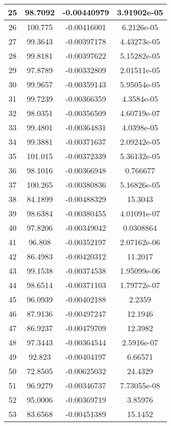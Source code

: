 \begin{table}[h]
{\begin{tabular}{|c|c|c|c|}
25 & 98.7092 & -0.00440979 & 3.91902e-05 \\ \hline 
26 & 100.775 & -0.00416001 & 6.2126e-05 \\ \hline 
27 & 99.3643 & -0.00397178 & 4.43273e-05 \\ \hline 
28 & 99.8181 & -0.00397622 & 5.15282e-05 \\ \hline 
29 & 97.8789 & -0.00332809 & 2.01511e-05 \\ \hline 
30 & 99.9657 & -0.00359143 & 5.95054e-05 \\ \hline 
31 & 99.7239 & -0.00366359 & 4.3584e-05 \\ \hline 
32 & 98.0351 & -0.00356509 & 4.60719e-07 \\ \hline 
33 & 99.4801 & -0.00364831 & 4.0398e-05 \\ \hline 
34 & 99.3881 & -0.00371637 & 2.09242e-05 \\ \hline 
35 & 101.015 & -0.00372339 & 5.36132e-05 \\ \hline 
36 & 98.1016 & -0.00366948 & 0.766677 \\ \hline 
37 & 100.265 & -0.00380836 & 5.16826e-05 \\ \hline 
38 & 84.1899 & -0.00488329 & 15.3043 \\ \hline 
39 & 98.6384 & -0.00380455 & 4.01091e-07 \\ \hline 
40 & 97.8206 & -0.00349042 & 0.0308864 \\ \hline 
41 & 96.808 & -0.00352197 & 2.07162e-06 \\ \hline 
42 & 86.4983 & -0.00420312 & 11.2017 \\ \hline 
43 & 99.1538 & -0.00374538 & 1.95099e-06 \\ \hline 
44 & 98.6514 & -0.00371103 & 1.79772e-07 \\ \hline 
45 & 96.0939 & -0.00402188 & 2.2359 \\ \hline 
46 & 87.9136 & -0.00497247 & 12.1946 \\ \hline 
47 & 86.9237 & -0.00479709 & 12.3982 \\ \hline 
48 & 97.3443 & -0.00364544 & 2.5916e-07 \\ \hline 
49 & 92.823 & -0.00404197 & 6.66571 \\ \hline 
50 & 72.8505 & -0.00625032 & 24.4329 \\ \hline 
51 & 96.9279 & -0.00346737 & 7.73055e-08 \\ \hline 
52 & 95.0006 & -0.00369719 & 3.85976 \\ \hline 
53 & 83.6568 & -0.00451389 & 15.1452 \\ \hline 

\end{tabular}}
\end{table}
